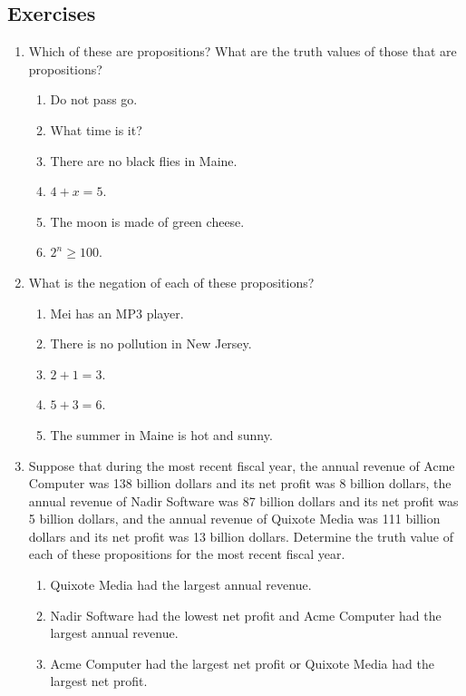 \documentclass{article}
\begin{document}
    \subsection{Exercises}
    \begin{enumerate}
        \item Which of these are propositions? What are the truth values of those that are propositions?
            \begin{enumerate}
                \item Do not pass go.
                \item What time is it?
                \item There are no black flies in Maine.
                \item $4+x=5$.
                \item The moon is made of green cheese.
                \item $2^n \geq 100$. 
            \end{enumerate}
        \item What is the negation of each of these propositions?
            \begin{enumerate}
                \item Mei has an MP3 player.
                \item There is no pollution in New Jersey.
                \item $2 +1 = 3$.
                \item $5+ 3 = 6$.
                \item The summer in Maine is hot and sunny.
            \end{enumerate}
        \item Suppose that during the most recent fiscal year, the annual revenue of Acme Computer was 138 billion dollars and its net profit was 8 billion dollars, the annual revenue of Nadir Software was 87 billion dollars and its net profit was 5 billion dollars, and the annual revenue of Quixote Media was 111 billion dollars and its net profit was 13 billion dollars. Determine the truth value of each of these propositions for the most recent fiscal year.
            \begin{enumerate}
                \item Quixote Media had the largest annual revenue.
                \item Nadir Software had the lowest net profit and Acme Computer had the largest annual revenue.
                \item Acme Computer had the largest net profit or Quixote Media had the largest net profit.

\end{enumerate}
\end{enumerate}
\end{document}
